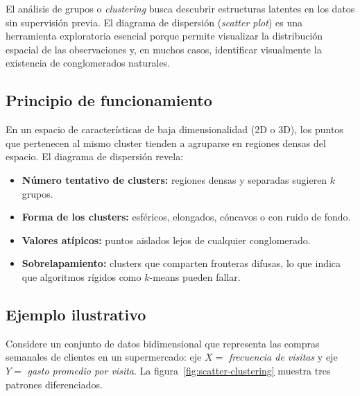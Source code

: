 
El análisis de grupos o \emph{clustering} busca descubrir estructuras latentes en los datos sin supervisión previa. El diagrama de dispersión (\emph{scatter plot}) es una herramienta exploratoria esencial porque permite visualizar la distribución espacial de las observaciones y, en muchos casos, identificar visualmente la existencia de conglomerados naturales.

\subsection{Principio de funcionamiento}

En un espacio de características de baja dimensionalidad (2D o 3D), los puntos que pertenecen al mismo cluster tienden a agruparse en regiones densas del espacio. El diagrama de dispersión revela:

\begin{itemize}[leftmargin=2em]
    \item \textbf{Número tentativo de clusters:} regiones densas y separadas sugieren $k$ grupos.
    \item \textbf{Forma de los clusters:} esféricos, elongados, cóncavos o con ruido de fondo.
    \item \textbf{Valores atípicos:} puntos aislados lejos de cualquier conglomerado.
    \item \textbf{Sobrelapamiento:} clusters que comparten fronteras difusas, lo que indica que algoritmos rígidos como $k$-means pueden fallar.
\end{itemize}

\subsection{Ejemplo ilustrativo}

Considere un conjunto de datos bidimensional que representa las compras semanales de clientes en un supermercado: eje $X =$ \emph{frecuencia de visitas} y eje $Y =$ \emph{gasto promedio por visita}. La figura~\ref{fig:scatter-clustering} muestra tres patrones diferenciados.

